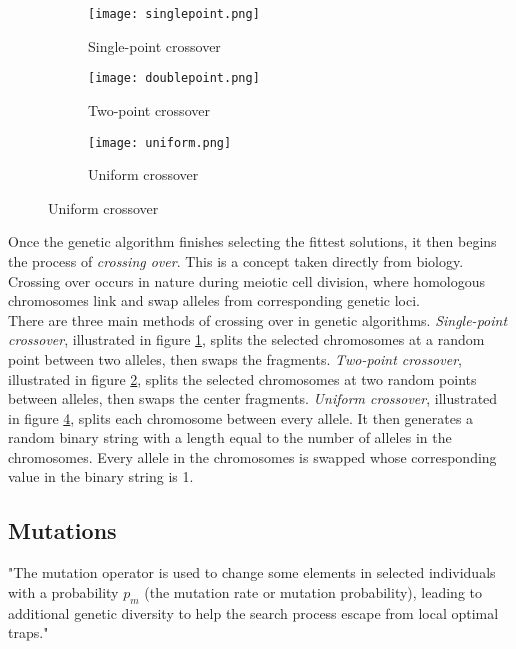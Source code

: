 \documentclass[a4paper]{article}
\begin{document}
\begin{figure}[h!]
    \centering
    \begin{subfigure}{\columnwidth}
        \texttt{[image: singlepoint.png]}
        \caption{Single-point crossover}
        \label{singlepoint}
    \end{subfigure}
    \begin{subfigure}{\columnwidth}
        \texttt{[image: doublepoint.png]}
        \caption{Two-point crossover}
        \label{twopoint}
    \end{subfigure}
    \begin{subfigure}{\linewidth}
        \texttt{[image: uniform.png]}
        \caption{Uniform crossover}
        \label{uniform}
    \end{subfigure}
\end{figure}

Once the genetic algorithm finishes selecting the fittest solutions, it then begins the process of \textit{crossing over}. This is a concept taken directly from biology. Crossing over occurs in nature during meiotic cell division, where homologous chromosomes link and swap alleles from corresponding genetic loci.\\

There are three main methods of crossing over in genetic algorithms. \textit{Single-point crossover}, illustrated in figure \ref{singlepoint}, splits the selected chromosomes at a random point between two alleles, then swaps the fragments. \textit{Two-point crossover}, illustrated in figure \ref{twopoint}, splits the selected chromosomes at two random points between alleles, then swaps the center fragments. \textit{Uniform crossover}, illustrated in figure \ref{uniform}, splits each chromosome between every allele. It then generates a random binary string with a length equal to the number of alleles in the chromosomes. Every allele in the chromosomes is swapped whose corresponding value in the binary string is 1.

\subsection{Mutations}
"The mutation operator is used to change some elements in selected individuals with a probability $p_m$ (the mutation rate or mutation probability), leading to additional genetic diversity to help the search process escape from local optimal traps."\cite{adaptcm}\\
\end{document}
